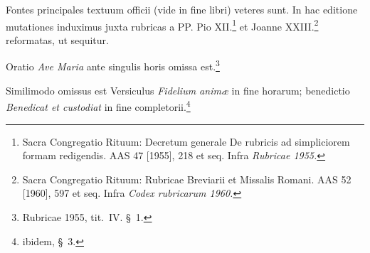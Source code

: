 
\begin{multicols}{2}

Fontes principales textuum officii (vide in fine libri) veteres sunt.
In hac editione mutationes induximus juxta rubricas 
a PP. Pio XII.\footnote{Sacra Congregatio Rituum:
  Decretum generale
  De rubricis ad simpliciorem formam redigendis.
  AAS 47 [1955], 218 et seq.
  Infra \textit{Rubricae 1955.}} 
et Joanne XXIII.\footnote{Sacra Congregatio Rituum:
  Rubricae Breviarii et Missalis Romani.
  AAS 52 [1960], 597 et seq.
  Infra \textit{Codex rubricarum 1960.}} reformatas,
ut sequitur.

Oratio \textit{Ave Maria} ante singulis horis omissa est.\footnote{Rubricae 1955, tit.~IV. §~1.}

Similimodo omissus est Versiculus \textit{Fidelium animæ} in fine horarum;
benedictio \textit{Benedicat et custodiat} in fine completorii.\footnote{ibidem, §~3.}




\end{multicols}
